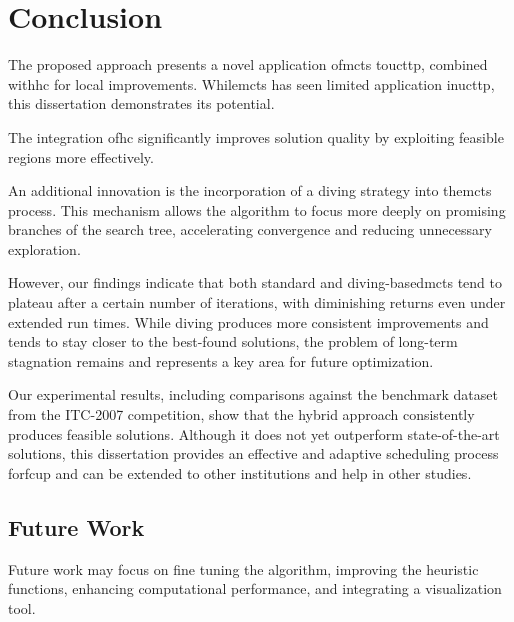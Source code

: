 
\chapter{Conclusion}


\label{Conclusion}

The proposed approach presents a novel application of\ac{mcts} to\ac{ucttp}, combined with\ac{hc} for local improvements. While\ac{mcts} has seen limited application in\ac{ucttp}, this dissertation demonstrates its potential.

The integration of\ac{hc} significantly improves solution quality by exploiting feasible regions more effectively.

An additional innovation is the incorporation of a diving strategy into the\ac{mcts} process. This mechanism allows the algorithm to focus more deeply on promising branches of the search tree, accelerating convergence and reducing unnecessary exploration.

However, our findings indicate that both standard and diving-based\ac{mcts} tend to plateau after a certain number of iterations, with diminishing returns even under extended run times. While diving produces more consistent improvements and tends to stay closer to the best-found solutions, the problem of long-term stagnation remains and represents a key area for future optimization.

Our experimental results, including comparisons against the benchmark dataset from the ITC-2007 competition, show that the hybrid approach consistently produces feasible solutions. Although it does not yet outperform state-of-the-art solutions, this dissertation provides an effective and adaptive scheduling process for\ac{fcup} and can be extended to other institutions and help in other studies. 

\section{Future Work}

Future work may focus on fine tuning the algorithm, improving the heuristic functions, enhancing computational performance, and integrating a visualization tool.

